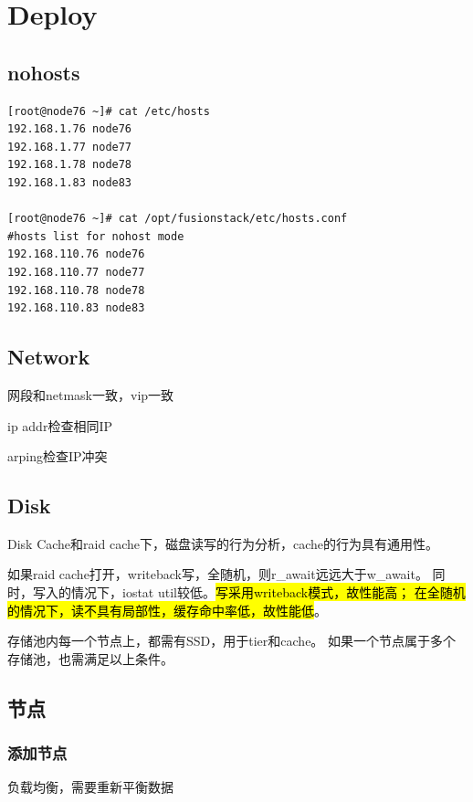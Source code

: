 \chapter{Deploy}

\section{nohosts}

\begin{lstlisting}[frame=single]
[root@node76 ~]# cat /etc/hosts
192.168.1.76 node76
192.168.1.77 node77
192.168.1.78 node78
192.168.1.83 node83

[root@node76 ~]# cat /opt/fusionstack/etc/hosts.conf 
#hosts list for nohost mode
192.168.110.76 node76
192.168.110.77 node77
192.168.110.78 node78
192.168.110.83 node83
\end{lstlisting}

\section{Network}

网段和netmask一致，vip一致

ip addr检查相同IP

arping检查IP冲突 

\section{Disk}

Disk Cache和raid cache下，磁盘读写的行为分析，cache的行为具有通用性。

如果raid cache打开，writeback写，全随机，则r\_await远远大于w\_await。
同时，写入的情况下，iostat util较低。\hl{写采用writeback模式，故性能高；
在全随机的情况下，读不具有局部性，缓存命中率低，故性能低}。

\begin{tcolorbox}
存储池内每一个节点上，都需有SSD，用于tier和cache。
如果一个节点属于多个存储池，也需满足以上条件。
\end{tcolorbox}

\section{节点}

\subsection{添加节点}

负载均衡，需要重新平衡数据

